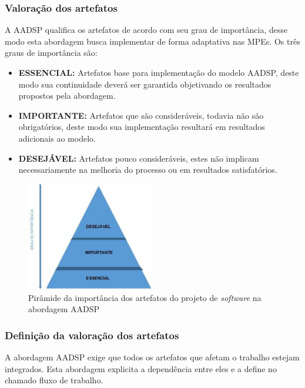\documentclass{acm_proc_article-sp}
\begin{document}
\subsubsection*{Valoração dos artefatos}
A AADSP qualifica os artefatos de acordo com seu grau de importância, desse modo esta abordagem busca implementar de forma adaptativa nas MPEs. Os três graus de importância são:

\begin{itemize}
\item \textbf{ESSENCIAL:} Artefatos base para implementação do modelo AADSP, deste modo sua continuidade deverá ser garantida objetivando os resultados propostos pela abordagem\cite{aadsp:hibirdo}.
\item \textbf{IMPORTANTE:} Artefatos que são consideráveis, todavia não são obrigatórios, deste modo sua implementação resultará em resultados adicionais ao modelo\cite{aadsp:hibirdo}.
\item \textbf{DESEJÁVEL:} Artefatos pouco consideráveis, estes não implicam necessariamente na melhoria do processo ou em resultados satisfatórios\cite{aadsp:hibirdo}.
\end{itemize}

\begin{figure}[h]
\centering %
\includegraphics[width=0.5\textwidth]{AADSP_Piramidade_de_importancia_dos_artefatos.jpg} %
\caption{Pirâmide da importância dos artefatos do projeto de \textit{software} na abordagem AADSP  \cite{aadsp:hibirdo}}
\end{figure}

\subsubsection*{Definição da valoração dos artefatos}
A abordagem AADSP  exige que todos os artefatos que afetam o trabalho estejam integrados. Esta abordagem explicita a dependência entre eles e a define no chamado fluxo de trabalho\cite{aadsp:hibirdo}.
\end{document}
